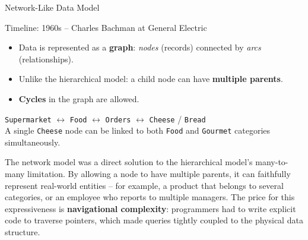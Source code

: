 \begin{frame}{Network-Like Data Model}
  \begin{block}{Timeline: 1960s -- Charles Bachman at General Electric}
    \begin{itemize}
      \item Data is represented as a \textbf{graph}: \emph{nodes} (records)
            connected by \emph{arcs} (relationships).
      \item Unlike the hierarchical model: a child node can have
            \textbf{multiple parents}.
      \item \textbf{Cycles} in the graph are allowed.
    \end{itemize}
  \end{block}

  \begin{examples}{}
    \texttt{Supermarket} $\leftrightarrow$ \texttt{Food} $\leftrightarrow$
    \texttt{Orders} $\leftrightarrow$ \texttt{Cheese} / \texttt{Bread}\\[2pt]
    A single \texttt{Cheese} node can be linked to both \texttt{Food} and
    \texttt{Gourmet} categories simultaneously.
  \end{examples}

  The network model was a direct solution to the hierarchical model's
  many-to-many limitation.  By allowing a node to have multiple parents,
  it can faithfully represent real-world entities -- for example, a product
  that belongs to several categories, or an employee who reports to
  multiple managers.  The price for this expressiveness is \textbf{navigational
  complexity}: programmers had to write explicit code to traverse pointers,
  which made queries tightly coupled to the physical data structure.
\end{frame}

